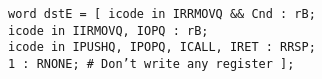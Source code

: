 \documentclass{article}
\begin{document}
\texttt{word dstE = [
\hspace*{17mm} icode in {IRRMOVQ} \&\& Cnd : rB; \\
\hspace*{17mm} icode in {IIRMOVQ, IOPQ} : rB; \\
\hspace*{17mm} icode in {IPUSHQ, IPOPQ, ICALL, IRET} : RRSP; \\
\hspace*{17mm} 1 : RNONE; \# Don't write any register
\hspace*{5mm}];}
\end{document}
